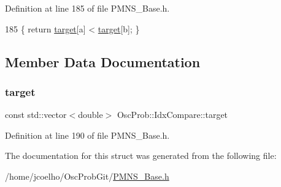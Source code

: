 Definition at line 185 of file P\+M\+N\+S\+\_\+\+Base.\+h.


\begin{DoxyCode}
185 \{ \textcolor{keywordflow}{return} \hyperlink{structOscProb_1_1IdxCompare_ab3258085f0afeb64bf472413bfed43ac}{target}[a] < \hyperlink{structOscProb_1_1IdxCompare_ab3258085f0afeb64bf472413bfed43ac}{target}[b]; \}
\end{DoxyCode}


\subsection{Member Data Documentation}
\mbox{\label{structOscProb_1_1IdxCompare_ab3258085f0afeb64bf472413bfed43ac}} 
\subsubsection{\texorpdfstring{target}{target}}
{\footnotesize\ttfamily const std\+::vector$<$double$>$ Osc\+Prob\+::\+Idx\+Compare\+::target\hspace{0.3cm}{\ttfamily [private]}}



Definition at line 190 of file P\+M\+N\+S\+\_\+\+Base.\+h.



The documentation for this struct was generated from the following file\+:\begin{DoxyCompactItemize}
\item 
/home/jcoelho/\+Osc\+Prob\+Git/\hyperlink{PMNS__Base_8h}{P\+M\+N\+S\+\_\+\+Base.\+h}\end{DoxyCompactItemize}
